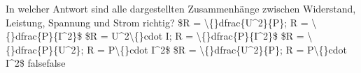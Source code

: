    {In welcher Antwort sind alle dargestellten Zusammenhänge zwischen Widerstand, Leistung, Spannung und Strom richtig?}
    {\$R = \textbackslash\{\}dfrac\{U\textasciicircum{}2\}\{P\};  R = \textbackslash\{\}dfrac\{P\}\{I\textasciicircum{}2\}\$}
    {\$R = U\textasciicircum{}2\textbackslash\{\}cdot I;  R = \textbackslash\{\}dfrac\{P\}\{I\textasciicircum{}2\}\$}
    {\$R = \textbackslash\{\}dfrac\{P\}\{U\textasciicircum{}2\};  R = P\textbackslash\{\}cdot I\textasciicircum{}2\$}
    {\$R = \textbackslash\{\}dfrac\{U\textasciicircum{}2\}\{P\};  R = P\textbackslash\{\}cdot I\textasciicircum{}2\$}
    {false}{false}